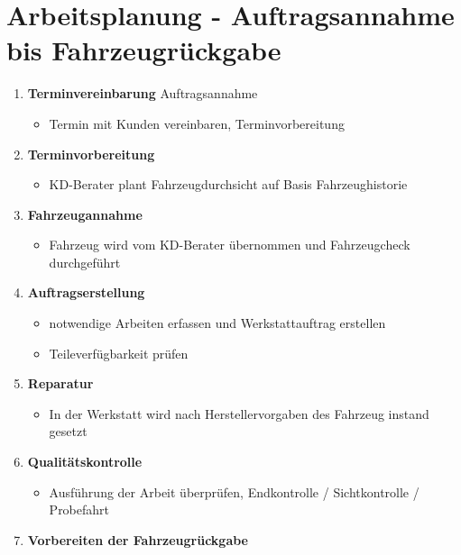 \section{Arbeitsplanung - Auftragsannahme bis
Fahrzeugrückgabe}\label{arbeitsplanung-auftragsannahme-bis-fahrzeugrueckgabe}

\begin{enumerate}
\item
  \textbf{Terminvereinbarung} Auftragsannahme

  \begin{itemize}
  \item
    Termin mit Kunden vereinbaren, Terminvorbereitung
  \end{itemize}
\item
  \textbf{Terminvorbereitung}

  \begin{itemize}
  \item
    KD-Berater plant Fahrzeugdurchsicht auf Basis Fahrzeughistorie
  \end{itemize}
\item
  \textbf{Fahrzeugannahme}

  \begin{itemize}
  \item
    Fahrzeug wird vom KD-Berater übernommen und Fahrzeugcheck
    durchgeführt
  \end{itemize}
\item
  \textbf{Auftragserstellung}

  \begin{itemize}
  \item
    notwendige Arbeiten erfassen und Werkstattauftrag erstellen
  \item
    Teileverfügbarkeit prüfen
  \end{itemize}
\item
  \textbf{Reparatur}

  \begin{itemize}
  \item
    In der Werkstatt wird nach Herstellervorgaben des Fahrzeug instand
    gesetzt
  \end{itemize}
\item
  \textbf{Qualitätskontrolle}

  \begin{itemize}
  \item
    Ausführung der Arbeit überprüfen, Endkontrolle / Sichtkontrolle /
    Probefahrt
  \end{itemize}
\item
  \textbf{Vorbereiten der Fahrzeugrückgabe}


\end{enumerate}
